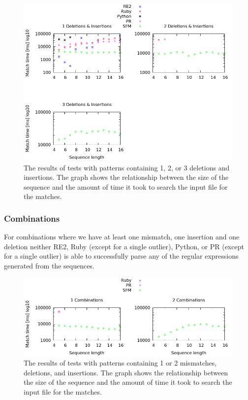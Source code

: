 \documentclass[12pt]{article}
\theoremstyle{definition}
\begin{document}
\begin{figure}[H]
	\begin{center}
		\includegraphics[scale=0.55]{graphs/deletions_insertions.png}	
	\end{center}
	\caption{The results of tests with patterns containing 1, 2, or 3 deletions and insertions. The graph shows the relationship between the size of the sequence and the amount of time it took to search the input file for the matches.}
	\label{graph:cases:combinations}
\end{figure}

\subsubsection{Combinations}

For combinations where we have at least one mismatch, one insertion and one deletion neither RE2, Ruby (except for a single outlier), Python, or PR (except for a single outlier) is able to successfully parse any of the regular expressions generated from the sequences.

\begin{figure}[H]
	\begin{center}
		\includegraphics[scale=0.55]{graphs/combinations.png}	
	\end{center}
	\caption{The results of tests with patterns containing 1 or 2 mismatches, deletions, and insertions. The graph shows the relationship between the size of the sequence and the amount of time it took to search the input file for the matches.}
	\label{graph:cases:combinations}
\end{figure}
\end{document}
